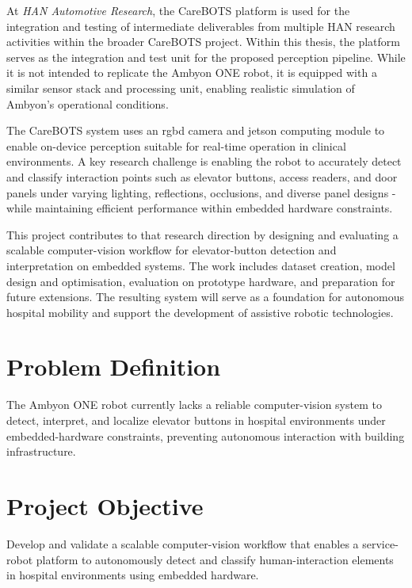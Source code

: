 At \textit{HAN Automotive Research}, the CareBOTS platform is used for the integration and testing of intermediate deliverables from multiple HAN research activities within the broader CareBOTS project. Within this thesis, the platform serves as the integration and test unit for the proposed perception pipeline. While it is not intended to replicate the Ambyon ONE robot, it is equipped with a similar sensor stack and processing unit, enabling realistic simulation of Ambyon's operational conditions.

The CareBOTS system uses an \gls{rgbd} camera and \gls{jetson} computing module to enable on-device perception suitable for real-time operation in clinical environments. A key research challenge is enabling the robot to accurately detect and classify interaction points such as elevator buttons, access readers, and door panels under varying lighting, reflections, occlusions, and diverse panel designs - while maintaining efficient performance within embedded hardware constraints.

This project contributes to that research direction by designing and evaluating a scalable computer-vision workflow for elevator-button detection and interpretation on embedded systems. The work includes dataset creation, model design and optimisation, evaluation on prototype hardware, and preparation for future extensions. The resulting system will serve as a foundation for autonomous hospital mobility and support the development of assistive robotic technologies.


\section{Problem Definition}
The Ambyon ONE robot currently lacks a reliable computer-vision system to detect, interpret, and localize elevator buttons in hospital environments under embedded-hardware constraints, preventing autonomous interaction with building infrastructure.
\section{Project Objective}
Develop and validate a scalable computer-vision workflow that enables a service-robot platform to autonomously detect and classify human-interaction elements in hospital environments using embedded hardware.

